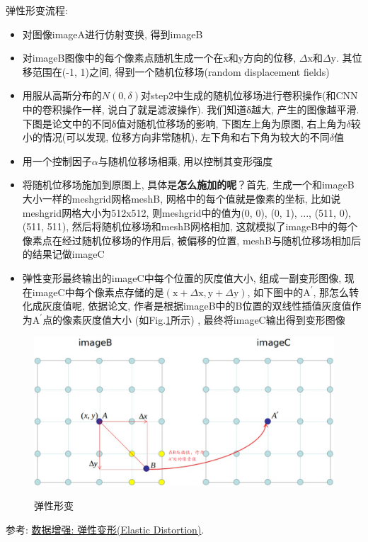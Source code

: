 弹性形变流程: 
\begin{itemize}
	\item 对图像imageA进行仿射变换, 得到imageB
	\item 对imageB图像中的每个像素点随机生成一个在x和y方向的位移, $\Delta \mathrm{x}$和$\Delta \mathrm{y}$. 其位移范围在(-1, 1)之间, 得到一个随机位移场(random displacement fields)
	\item 用服从高斯分布的$N(0, \delta)$对step2中生成的随机位移场进行卷积操作(和CNN中的卷积操作一样, 说白了就是滤波操作). 我们知道δ越大, 产生的图像越平滑. 下图是论文中的不同δ值对随机位移场的影响, 下图左上角为原图, 右上角为$\delta$较小的情况(可以发现, 位移方向非常随机), 左下角和右下角为较大的不同$\delta$值
	\item 用一个控制因子$\alpha$与随机位移场相乘, 用以控制其变形强度
	\item 将随机位移场施加到原图上, 具体是\textbf{怎么施加的呢}？首先, 生成一个和imageB大小一样的meshgrid网格meshB, 网格中的每个值就是像素的坐标, 比如说meshgrid网格大小为512x512, 则meshgrid中的值为(0, 0), (0, 1), ..., (511, 0), (511, 511), 然后将随机位移场和meshB网格相加, 这就模拟了imageB中的每个像素点在经过随机位移场的作用后, 被偏移的位置, meshB与随机位移场相加后的结果记做imageC
	\item 弹性变形最终输出的imageC中每个位置的灰度值大小, 组成一副变形图像, 现在imageC中每个像素点存储的是$(\mathrm{x}+\Delta \mathrm{x}, \mathrm{y}+\Delta \mathrm{y})$, 如下图中的$\mathrm{A}^{\prime}$, 那怎么转化成灰度值呢, 依据论文, 作者是根据imageB中的B位置的双线性插值灰度值作为$\mathrm{A}^{\prime}$点的像素灰度值大小 (如Fig.\ref{fig:elastic-deform}所示) , 最终将imageC输出得到变形图像
\end{itemize}
\begin{figure}[h]
	\centering
	\includegraphics[width=.8\textwidth]{pics/elastic_deform.png}
	\label{fig:elastic-deform}
	\caption{弹性形变}
\end{figure}
参考: \href{https://zhuanlan.zhihu.com/p/342274228}{数据增强: 弹性变形(Elastic Distortion)}. 

